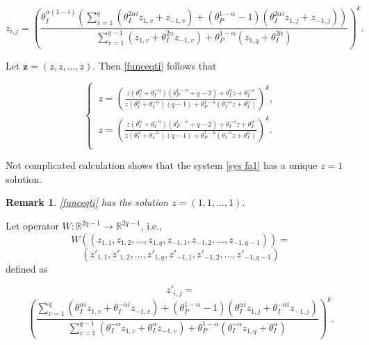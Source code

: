 \documentclass[sn-mathphys]{sn-jnl}%
\theoremstyle{thmstyleone}%
\theoremstyle{thmstyletwo}%
\newtheorem{remark}{Remark}%
\theoremstyle{thmstylethree}%
\begin{document}
\begin{equation}\label{funceqti}z_{i,j}=\left(\frac{\theta_I^{\alpha (1-i)}\left(\sum\limits_{v=1}^{q}\left(\theta_I^{2\alpha i}z_{1,v}+z_{-1,v} \right)+\left(\theta_P^{1-\alpha}-1\right)\left(\theta_I^{2\alpha i}z_{1,j}+z_{-1,j}\right) \right)}{\sum\limits_{v=1}^{q-1}\left(z_{1,v}+\theta_I^{2\alpha }z_{-1,v} \right)+\theta_P^{1-\alpha}\left(z_{1,q}+\theta_{I}^{2\alpha }\right)}\right)^k.
\end{equation}

Let $\textbf{z}=(z,z,...,z)$. Then \eqref{funceqti}  follows that

\begin{equation}\label{sys fa1}
\left\{
\begin{array}{llll}
\ z=\left(\frac{z(\theta_{I}^{\alpha }+\theta_{I}^{-\alpha })(\theta_{P}^{1-\alpha}+q-2)+\theta_I^{\alpha }z+\theta_I^{-\alpha }}{z(\theta_{I}^{\alpha }+\theta_{I}^{-\alpha })(q-1)+\theta_{P}^{1-\alpha}(\theta_I^{-\alpha }z+\theta_I^{\alpha })}\right)^k,\\[3mm]
\ z=\left(\frac{z(\theta_{I}^{\alpha }+\theta_{I}^{-\alpha })(\theta_{P}^{1-\alpha}+q-2)+\theta_I^{-\alpha }z+\theta_I^{\alpha }}{z(\theta_{I}^{\alpha }+\theta_{I}^{-\alpha })(q-1)+\theta_{P}^{1-\alpha}(\theta_I^{-\alpha }z+\theta_I^{\alpha })}\right)^k.\\[3mm]
\end{array}\right.
\end{equation}

Not complicated calculation shows that the system \eqref{sys fa1} has a unique $z=1$ solution.
\begin{remark}\label{trivial} \eqref{funceqti} has the solution $z=(1,1,...,1)$.
\end{remark}
Let operator $W:\mathbb R^{2q-1}\rightarrow  \mathbb R^{2q-1}$, i.e., $$W\left((z_{1,1}, z_{1,2},...,z_{1,q},z_{-1,1}, z_{-1,2},...,z_{-1,q-1})\right)=$$$$(z'_{1,1}, z'_{1,2},...,z'_{1,q},z'_{-1,1}, z'_{-1,2},...,z'_{-1,q-1})$$ defined as

$$z'_{i,j}=$$
\begin{equation}\label{funceqtiop}\left(\frac{\sum\limits_{v=1}^{q}\left(\theta_I^{\alpha i}z_{1,v}+\theta_{I}^{-\alpha i}z_{-1,v} \right)+\left(\theta_P^{1-\alpha}-1\right)\left(\theta_I^{\alpha i}z_{1,j}+\theta_{I}^{-\alpha i}z_{-1,j}\right) }{\sum\limits_{v=1}^{q-1}\left(\theta_I^{-\alpha}z_{1,v}+\theta_I^{\alpha }z_{-1,v} \right)+\theta_P^{1-\alpha}\left(\theta_{I}^{-\alpha }z_{1,q}+\theta_{I}^{\alpha }\right)}\right)^k.
\end{equation}
\end{document}
